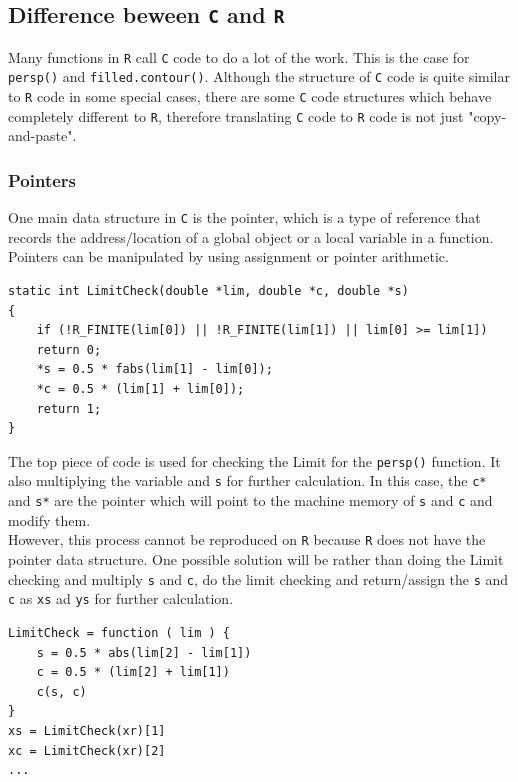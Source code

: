 \documentclass[paper=a4, fontsize=11pt]{report}
\begin{document}
\subsection{Difference beween \texttt{C} and \texttt{R}}
Many functions in \texttt{R} call \texttt{C} code to do a lot of the work.  This is the case for \texttt{persp()} and \texttt{filled.contour()}. Although the structure of \texttt{C} code is quite similar to \texttt{R} code in some special cases, there are some \texttt{C} code structures which behave completely different to \texttt{R}, therefore translating \texttt{C} code to \texttt{R} code is not just "copy-and-paste".\\

\subsubsection{Pointers}
One main data structure in \texttt{C} is the pointer, which is a type of reference that records the address/location of a global object or a local variable in a function. Pointers can be manipulated by using assignment or pointer arithmetic.
\begin{lstlisting}
static int LimitCheck(double *lim, double *c, double *s)
{
    if (!R_FINITE(lim[0]) || !R_FINITE(lim[1]) || lim[0] >= lim[1])
    return 0;
    *s = 0.5 * fabs(lim[1] - lim[0]);
    *c = 0.5 * (lim[1] + lim[0]);
    return 1;
}
\end{lstlisting}

The top piece of code is used for checking the Limit for the \texttt{persp()} function. It also multiplying the variable  and \texttt{s} for further calculation. In this case, the \texttt{c*} and \texttt{s*} are the pointer which will point to the machine memory of \texttt{s} and \texttt{c} and modify them.\\

However, this process cannot be reproduced on \texttt{R} because \texttt{R} does not have the pointer data structure. One possible solution will be rather than doing the Limit checking and multiply \texttt{s} and \texttt{c}, do the limit checking and return/assign the \texttt{s} and \texttt{c} as \texttt{xs} ad \texttt{ys} for further calculation.
\begin{lstlisting}
LimitCheck = function ( lim ) {
    s = 0.5 * abs(lim[2] - lim[1])
    c = 0.5 * (lim[2] + lim[1])
    c(s, c)
}
xs = LimitCheck(xr)[1]
xc = LimitCheck(xr)[2]
...
\end{lstlisting}
\end{document}

